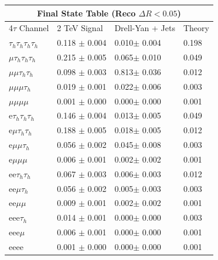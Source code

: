 \documentclass{article}
\begin{document}
 
\begin{landscape} 
\centering 
\begin{tabular}{|p{4.5cm}|p{3cm}|p{3cm}|p{3cm}|}\hline 
\multicolumn{4}{|c|}{Final State Table (Reco \(\Delta R < 0.05\))} \\ 
\hline 
4$\tau$ Channel & 2 TeV Signal & Drell-Yan + Jets & Theory \\ 
\hline 
$\tau_h$$\tau_h$$\tau_h$$\tau_h$ & 0.118 $\pm$ 0.004 & 0.010$\pm$ 0.004 & 0.198\\
\hline 
$\mu$$\tau_h$$\tau_h$$\tau_h$ & 0.215 $\pm$ 0.005 & 0.065$\pm$ 0.010 & 0.049\\
\hline 
$\mu$$\mu$$\tau_h$$\tau_h$ & 0.098 $\pm$ 0.003 & 0.813$\pm$ 0.036 & 0.012\\
\hline 
$\mu$$\mu$$\mu$$\tau_h$ & 0.019 $\pm$ 0.001 & 0.022$\pm$ 0.006 & 0.003\\
\hline 
$\mu$$\mu$$\mu$$\mu$ & 0.001 $\pm$ 0.000 & 0.000$\pm$ 0.000 & 0.001\\
\hline 
e$\tau_h$$\tau_h$$\tau_h$ & 0.146 $\pm$ 0.004 & 0.013$\pm$ 0.005 & 0.049\\
\hline 
e$\mu$$\tau_h$$\tau_h$ & 0.188 $\pm$ 0.005 & 0.018$\pm$ 0.005 & 0.012\\
\hline 
e$\mu$$\mu$$\tau_h$ & 0.056 $\pm$ 0.002 & 0.045$\pm$ 0.008 & 0.003\\
\hline 
e$\mu$$\mu$$\mu$ & 0.006 $\pm$ 0.001 & 0.002$\pm$ 0.002 & 0.001\\
\hline 
ee$\tau_h$$\tau_h$ & 0.067 $\pm$ 0.003 & 0.006$\pm$ 0.003 & 0.012\\
\hline 
ee$\mu$$\tau_h$ & 0.056 $\pm$ 0.002 & 0.005$\pm$ 0.003 & 0.003\\
\hline 
ee$\mu$$\mu$ & 0.009 $\pm$ 0.001 & 0.002$\pm$ 0.002 & 0.001\\
\hline 
eee$\tau_h$ & 0.014 $\pm$ 0.001 & 0.000$\pm$ 0.000 & 0.003\\
\hline 
eee$\mu$ & 0.006 $\pm$ 0.001 & 0.000$\pm$ 0.000 & 0.001\\
\hline 
eeee & 0.001 $\pm$ 0.000 & 0.000$\pm$ 0.000 & 0.001\\
\hline 
\end{tabular} 
\end{landscape} 
\end{document}
